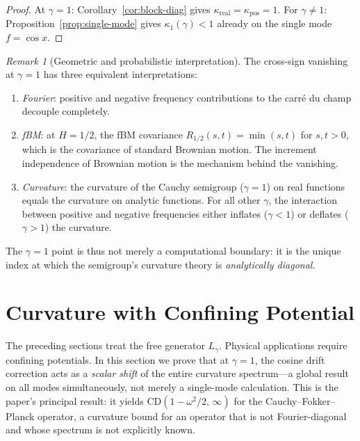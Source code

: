 \documentclass[11pt,a4paper]{article}
\theoremstyle{plain}
\theoremstyle{definition}
\theoremstyle{remark}
\newtheorem{remark}[theorem]{Remark}
\begin{document}
\begin{proof}
At $\gamma = 1$: Corollary~\ref{cor:block-diag} gives
$\kappa_{\mathrm{real}} = \kappa_{\mathrm{pos}} = 1$.
For $\gamma \neq 1$: Proposition~\ref{prop:single-mode} gives
$\kappa_1(\gamma) < 1$ already on the single mode $f = \cos x$.
\end{proof}

\begin{remark}[Geometric and probabilistic interpretation]
\label{rem:geometric}
The cross-sign vanishing at $\gamma = 1$ has three
equivalent interpretations:
\begin{enumerate}[label=(\alph*)]
\item \emph{Fourier}: positive and negative frequency
  contributions to the carr\'e du champ decouple
  completely.
\item \emph{fBM}: at $H = 1/2$, the fBM covariance
  $R_{1/2}(s,t) = \min(s,t)$ for $s,t > 0$, which is
  the covariance of standard Brownian motion.  The
  increment independence of Brownian motion is the
  mechanism behind the vanishing.
\item \emph{Curvature}: the curvature of the Cauchy
  semigroup ($\gamma = 1$) on real functions equals
  the curvature on analytic functions.  For all other
  $\gamma$, the interaction between positive and
  negative frequencies either inflates ($\gamma < 1$)
  or deflates ($\gamma > 1$) the curvature.
\end{enumerate}
The $\gamma = 1$ point is thus not merely a
computational boundary: it is the unique index at
which the semigroup's curvature theory is
\emph{analytically diagonal}.
\end{remark}


\section{Curvature with Confining Potential}\label{sec:potential}

The preceding sections treat the free generator $L_\gamma$.
Physical applications require confining potentials.
In this section we prove that at $\gamma = 1$, the cosine
drift correction acts as a \emph{scalar shift} of the entire
curvature spectrum---a global result on all modes simultaneously,
not merely a single-mode calculation.
This is the paper's principal result: it yields
$\mathrm{CD}(1 - \omega^2/2,\,\infty)$ for the
Cauchy--Fokker--Planck operator, a curvature bound for
an operator that is not Fourier-diagonal and whose spectrum
is not explicitly known.
\end{document}
